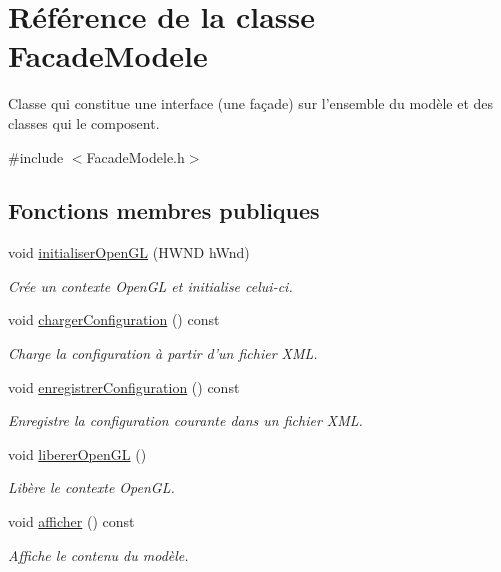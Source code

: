 \hypertarget{class_facade_modele}{\section{Référence de la classe Facade\-Modele}
\label{class_facade_modele}
}


Classe qui constitue une interface (une façade) sur l'ensemble du modèle et des classes qui le composent.  




{\ttfamily \#include $<$Facade\-Modele.\-h$>$}

\subsection*{Fonctions membres publiques}
\begin{DoxyCompactItemize}
\item 
void \hyperlink{group__inf2990_gabf12ccafbabf1049cb8327cf78699a1b}{initialiser\-Open\-G\-L} (H\-W\-N\-D h\-Wnd)
\begin{DoxyCompactList}\small\item\em Crée un contexte Open\-G\-L et initialise celui-\/ci. \end{DoxyCompactList}\item 
void \hyperlink{group__inf2990_ga4967547e0683bfdca700118df1c18bca}{charger\-Configuration} () const 
\begin{DoxyCompactList}\small\item\em Charge la configuration à partir d'un fichier X\-M\-L. \end{DoxyCompactList}\item 
void \hyperlink{group__inf2990_ga277d8d9cea21e20fb366a0d48525f2c9}{enregistrer\-Configuration} () const 
\begin{DoxyCompactList}\small\item\em Enregistre la configuration courante dans un fichier X\-M\-L. \end{DoxyCompactList}\item 
void \hyperlink{group__inf2990_gac7b831ce13626514e9637c4533d7c15d}{liberer\-Open\-G\-L} ()
\begin{DoxyCompactList}\small\item\em Libère le contexte Open\-G\-L. \end{DoxyCompactList}\item 
void \hyperlink{group__inf2990_gac884e818dab5fe049a37b3f6f1c5d8c6}{afficher} () const 
\begin{DoxyCompactList}\small\item\em Affiche le contenu du modèle. \end{DoxyCompactList}\item 

\end{DoxyCompactItemize}
